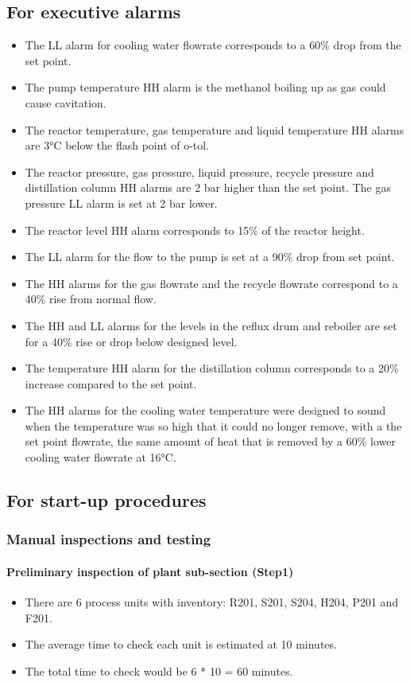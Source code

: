 \subsection{For executive alarms}
\begin{itemize}
    \item The LL alarm for cooling water flowrate corresponds to a 60\% drop from the set point.
    \item The pump temperature HH alarm is the methanol boiling up as gas could cause cavitation.
    \item The reactor temperature, gas temperature and liquid temperature HH alarms are 3°C below the flash point of o-tol.
    \item The reactor pressure, gas pressure, liquid pressure, recycle pressure and distillation column HH alarms are 2 bar higher than the set point. The gas pressure LL alarm is set at 2 bar lower.
    \item The reactor level HH alarm corresponds to 15\% of the reactor height.
    \item The LL alarm for the flow to the pump is set at a 90\% drop from set point.
    \item The HH alarms for the gas flowrate and the recycle flowrate correspond to a 40\% rise from normal flow.
    \item The HH and LL alarms for the levels in the reflux drum and reboiler are set for a 40\% rise or drop below designed level.
    \item The temperature HH alarm for the distillation column corresponds to a 20\% increase compared to the set point.
    \item The HH alarms for the cooling water temperature were designed to sound when the temperature was so high that it could no longer remove, with a the set point flowrate, the same amount of heat that is removed by a 60\% lower cooling water flowrate at 16°C.
\end{itemize}

\subsection{For start-up procedures}

\subsubsection{Manual inspections and testing}
\paragraph{Preliminary inspection of plant sub-section (Step1)}
    \begin{itemize}
        \item There are 6 process units with inventory: R201, S201, S204, H204, P201 and F201.
        \item The average time to check each unit is estimated at 10 minutes.
        \item The total time to check would be 6 * 10 = 60 minutes.
    \end{itemize}

